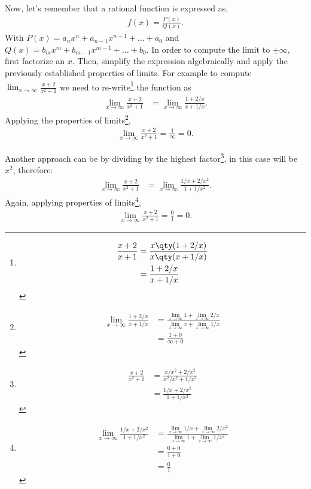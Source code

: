\documentclass[../main-notes.tex]{subfile}
\begin{document}
Now, let's remember that a rational function is expressed as,
\begin{gather*}
    f(x) = \frac{P(x)}{Q(x)}.
\end{gather*}
With \(P(x) = a_{n}x^{n} + a_{n-1}x^{n-1} + \ldots+a_{0}\) and \(Q(x) = b_{m}x^{m} + b_{m-1}x^{m-1} + \ldots+b_{0}\).
In order to compute the limit to $\pm\infty$, first factorize an $x$.
Then, simplify the expression algebraically and apply the previously established properties of limits.
For example to compute \(\lim_{x\to\infty}\frac{x+2}{x^2+1}\) we need to re-write\footnote{
    \begin{align*}
        \frac{x+2}{x+1} &= \frac{x\qty(1+2/x)}{x\qty(x+1/x)} \\
                        &= \frac{1+2/x}{x+1/x}
    \end{align*}
} the function as 
\begin{align*}
     \lim_{x\to\infty}\frac{x+2}{x^2+1}&= \lim_{x\to\infty}\frac{1+2/x}{x+1/x}.
\end{align*}
Applying the properties of limits\footnote{
    \begin{align*}
        \lim_{x\to\infty}\frac{1+2/x}{x+1/x} &= \frac{\lim_{x\to\infty}1+\lim_{x\to\infty}2/x}{\lim_{x\to\infty}x+\lim_{x\to\infty}1/x} \\
                                             &= \frac{1+0}{\infty+0}
    \end{align*}
},
\begin{gather*}
     \lim_{x\to\infty}\frac{x+2}{x^2+1}= \frac{1}{\infty} = 0.
\end{gather*}

Another approach can be by dividing by the highest factor\footnote{
    \begin{align*}
        \frac{x+2}{x^2+1}&=\frac{x/x^2+2/x^2}{x^2/x^2+1/x^2} \\
                         &=\frac{1/x+2/x^2}{1+1/x^2}
    \end{align*}
}, in this case will be $x^2$, therefore:
\begin{align*}
     \lim_{x\to\infty}\frac{x+2}{x^2+1}&= \lim_{x\to\infty}\frac{1/x+2/x^2}{1+1/x^2}.
\end{align*}
Again, applying properties of limits\footnote{
\begin{align*}
    \lim_{x\to\infty}\frac{1/x+2/x^2}{1+1/x^2}&= \frac{\lim_{x\to\infty}1/x + \lim_{x\to\infty}2/x^2}{\lim_{x\to\infty}1+\lim_{x\to\infty}1/x^2} \\
                                              &= \frac{0+0}{1+0} \\
                                              &= \frac{0}{1}
\end{align*}
},
\begin{gather*}
     \lim_{x\to\infty}\frac{x+2}{x^2+1}= \frac{0}{1}=0.
\end{gather*}
\end{document}
